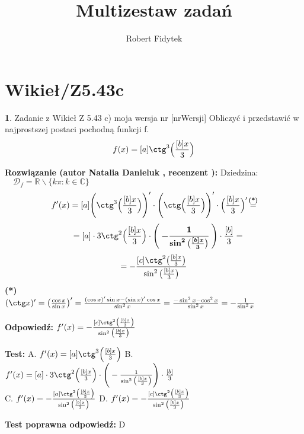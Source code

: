 \documentclass[12pt, a4paper]{article}
\title{Multizestaw zadań}
\author{Robert Fidytek}
\date{}
\theoremstyle{definition} %
\newtheorem{zad}{}
\newcommand{\kategoria}[1]{\section{#1}} %
\newcommand{\zadStart}[1]{\begin{zad}#1\newline} %
\newcommand{\zadStop}{\end{zad}}   %
\newcommand{\rozwStart}[2]{\noindent \textbf{Rozwiązanie (autor #1 , recenzent #2): }\newline} %
\newcommand{\rozwStop}{\newline}                                            %
\newcommand{\odpStart}{\noindent \textbf{Odpowiedź:}\newline}    %
\newcommand{\odpStop}{\newline}                                             %
\newcommand{\testStart}{\noindent \textbf{Test:}\newline} %
\newcommand{\testStop}{\newline} %
\newcommand{\kluczStart}{\noindent \textbf{Test poprawna odpowiedź:}\newline} %
\newcommand{\kluczStop}{\newline} %
\begin{document}
\maketitle

\kategoria{Wikieł/Z5.43c}

\zadStart{Zadanie z Wikieł Z 5.43 c) moja wersja nr [nrWersji]}
Obliczyć i przedstawić w najprostszej postaci pochodną funkcji f.
$$f(x) = [a]\ctg^3\Big(\frac{[b]x}{3}\Big)$$
\zadStop

\rozwStart{Natalia Danieluk}{}
Dziedzina: $\quad \mathcal{D}_f=\mathbb{R}\backslash\{k\pi : k \in \mathbb{C} \}$
$$f'(x) = [a]\Bigg(\ctg^3\Big(\frac{[b]x}{3}\Big)\Bigg)' \cdot \Bigg(\ctg\Big(\frac{[b]x}{3}\Big)\Bigg)' \cdot \Big(\frac{[b]x}{3}\Big)' 
\mathrel{\stackrel{\makebox[0pt]{\mbox{\normalfont\scriptsize\textbf{(*)}}}}{=}}$$
$$\quad= [a] \cdot 3 \ctg^2\Big(\frac{[b]x}{3}\Big) \cdot \Bigg(\boldsymbol{-\frac{1}{\sin^2\big(\frac{[b]x}{3}\big)}}\Bigg) \cdot \frac{[b]}{3} =$$
$$= -\frac{[c]\ctg^2\big(\frac{[b]x}{3}\big)}{\sin^2\big(\frac{[b]x}{3}\big)}$$
{\normalfont\scriptsize\textbf{(*)}\\
$(\ctg x)' = \big(\frac{\cos x}{\sin x} \big)' = \frac{(\cos x)'\sin x - (\sin x)'\cos x}{\sin^2 x} = \frac{-\sin^2 x - \cos^2 x}{\sin^2 x} = -\frac{1}{\sin^2 x}$}
\rozwStop

\odpStart
$f'(x) = -\frac{[c]\ctg^2\big(\frac{[b]x}{3}\big)}{\sin^2\big(\frac{[b]x}{3}\big)}$
\odpStop

\testStart
A. $f'(x) = [a]\ctg^3\Big(\frac{[b]x}{3}\Big)$
B. $f'(x) = [a] \cdot 3 \ctg^2\Big(\frac{[b]x}{3}\Big) \cdot \Bigg(-\frac{1}{\sin^2\big(\frac{[b]x}{3}\big)}\Bigg) \cdot \frac{[b]}{3}$\\
C. $f'(x) = -\frac{[a]\ctg^2\big(\frac{[b]x}{3}\big)}{\sin^2\big(\frac{[b]x}{3}\big)}$
D. $f'(x) = -\frac{[c]\ctg^2\big(\frac{[b]x}{3}\big)}{\sin^2\big(\frac{[b]x}{3}\big)}$
\testStop

\kluczStart
D
\kluczStop
\end{document}
